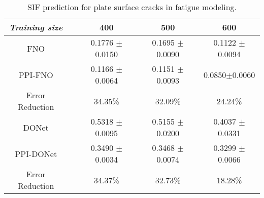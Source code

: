 \begin{table*}
    \small 
    \centering
    \begin{tabular}{ccccc}
        \hline
        \textit{Training size}      &  & {400}             & {500}         & {600}      \\ \hline
        FNO                  &  & 0.1776 $\pm$ 0.0150	& 0.1695 $\pm$ 0.0090   & 0.1122 $\pm$ 0.0094          \\
        PPI-FNO          &  & {0.1166} $\pm$ {0.0064}          & {0.1151} $\pm$ {0.0093}        &{0.0850}$\pm${0.0060} \\
        Error Reduction          &  & 34.35\% & 32.09\%        & 24.24\%		 \\ \hline
        DONet             &  & 0.5318 $\pm$ 0.0095          & 0.5155 $\pm$ 0.0200      & 0.4037 $\pm$ 0.0331 	  \\
        PPI-DONet             &  & 0.3490 $\pm$ 0.0034        & 0.3468 $\pm$ 0.0074    	& 0.3299 $\pm$ 0.0066	 \\ 
        Error Reduction  &  & 34.37\%         & 32.73\%    	& 18.28\%  \\ \hline
    \end{tabular}
    \caption{\small SIF prediction for plate surface cracks in fatigue modeling.}
    \label{tab:crack}
    \end{table*}

